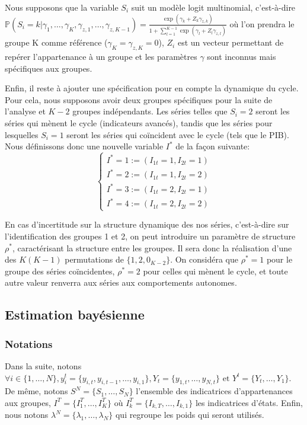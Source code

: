 \documentclass[10pt,french,french]{article}
\begin{document}
Nous supposons que la variable \(S_i\) suit un modèle logit multinomial, c'est-à-dire \(\mathbb{P}(S_i = k |\gamma_1, \dots, \gamma_K, \gamma_{z,1}, \dots, \gamma_{z,K-1}) = \displaystyle\frac{\exp(\gamma_k + Z_k\gamma_{z,k})}{1 + \sum\limits_{l=1}^{K-1} \exp(\gamma_l + Z_l\gamma_{z,l})}\) où l'on prendra le groupe K comme référence (\(\gamma_K = \gamma_{z,K}=0\)), \(Z_i\) est un vecteur permettant de repérer l'appartenance à un groupe et les paramètres \(\gamma\) sont inconnus mais spécifiques aux groupes.

Enfin, il reste à ajouter une spécification pour en compte la dynamique du cycle.
Pour cela, nous supposons avoir deux groupes spécifiques pour la suite de l'analyse et \(K-2\) groupes indépendants.
Les séries telles que \(S_i = 2\) seront les séries qui mènent le cycle (indicateurs avancés), tandis que les séries pour lesquelles \(S_i = 1\) seront les séries qui coïncident avec le cycle (tels que le PIB).
Nous définissons donc une nouvelle variable \(I^*\) de la façon suivante: \[\begin{cases}
I^* = 1 := (I_{1t}=1,I_{2t}=1) \\
I^* = 2 := (I_{1t}=1,I_{2t}=2) \\
I^* = 3 := (I_{1t}=2,I_{2t}=1) \\
I^* = 4 := (I_{1t}=2,I_{2t}=2) 
\end{cases}\]

En cas d'incertitude sur la structure dynamique des nos séries, c'est-à-dire sur l'identification des groupes 1 et 2, on peut introduire un paramètre de structure \(\rho^*\), caractérisant la structure entre les groupes.
Il sera donc la réalisation d'une des \(K(K-1)\) permutations de \(\{1,2,0_{K-2}\}\).
On considéra que \(\rho^*=1\) pour le groupe des séries coïncidentes, \(\rho^*=2\) pour celles qui mènent le cycle, et toute autre valeur renverra aux séries aux comportements autonomes.

\hypertarget{estimation-bayuxe9sienne}{%
\subsection{Estimation bayésienne}\label{estimation-bayuxe9sienne}}

\hypertarget{notations}{%
\subsubsection{Notations}\label{notations}}

Dans la suite, notons \(\forall i \in \{1,\dots,N\}, y_i^t = \{y_{i,t},y_{i,t-1},\dots,y_{i,1}\}, Y_t = \{y_{1,t}, \dots, y_{N,t} \} \text{ et } Y^t = \{Y_t, \dots, Y_1\}\).
De même, notons \(S^N = \{S_1, \dots, S_N\}\) l'ensemble des indicatrices d'appartenances aux groupes, \(I^T = \{I_1^T, \dots, I_K^T\}\) où \(I_k^T=\{I_{k,T}, \dots, I_{k,1}\}\) les indicatrices d'états.
Enfin, nous notons \(\lambda^N = \{\lambda_1, \dots, \lambda_N\}\) qui regroupe les poids qui seront utilisés.
\end{document}
